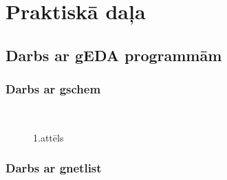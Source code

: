 \documentclass {report}
\begin{document}
\chapter{Praktiskā daļa}
\section{Darbs ar gEDA programmām}
\subsection{Darbs ar gschem}

\begin{figure}
\\
\caption{1.attēls}
\label{i:example}
\end{figure}

\subsection{Darbs ar gnetlist}
 \\
\end{document}
